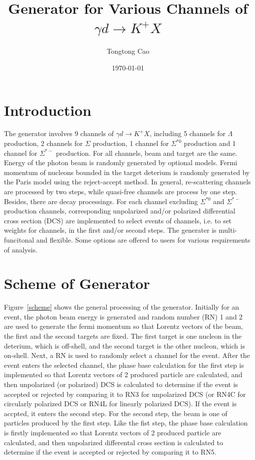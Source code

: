 \documentclass[a4paper]{article}
\title{Generator for Various Channels of $\gamma d\rightarrow K^+X$}
\author{Tongtong Cao}
\date{\today}
\begin{document}
\fontsize{12}{15}
\selectfont
\maketitle
\section{Introduction}
The generator involves 9 channels of $\gamma d\rightarrow K^+X$, including 5 channels for $\Lambda$ production, 2 channels for $\Sigma$ production, 1 channel for $\Sigma^{*0}$ production and 1 channel for $\Sigma^{*-}$ production. For all channels, beam and target are the same. Energy of the photon beam is randomly generated by optional models. Fermi momentum of nucleons bounded in the target deterium is randomly generated by the Paris model using the reject-accept method. In general, re-scattering channels are processed by two steps, while quasi-free channels are process by one step. Besides, there are decay processings.  For each channel excluding $\Sigma^{*0}$ and $\Sigma^{*-}$ production channels, corresponding unpolarized and/or polarized differential cross section (DCS) are implemented to select events of channels, i.e. to set weights for channels, in the first and/or second steps. The generater is multi-funcitonal and flexible. Some options are offered to users for various requirements of analysis.

\section{Scheme of Generator}
Figure~\ref{scheme} shows the general processing of the generator. Initially for an event, the photon beam energy is generated and random number (RN) 1 and 2 are used to generate the fermi momentum so that Lorentz vectors of the beam, the first and the second targets are fixed. The first target is one nucleon in the deterium, which is off-shell, and the second target is the other nucleon, which is on-shell. Next, a RN is used to randomly select a channel for the event. After the event enters the selected channel, the phase base calculation for the first step is implemented so that Lorentz vectors of 2 produced particle are calculated, and then unpolarized (or polarized) DCS is calculated to determine if the event is accepted or rejected by comparing it to RN3 for unpolarized DCS (or RN4C for circularly polarized DCS or RN4L for linearly polarized DCS). If the event is accpted, it enters the second step. For the second step, the beam is one of particles produced by the first step. Like the fist step, the phase base calculation is firstly implemented so that Lorentz vectors of 2 produced particle are calculated, and then unpolarized differental cross section is calculated to determine if the event is accepted or rejected  by comparing it to RN5. 
\end{document}

